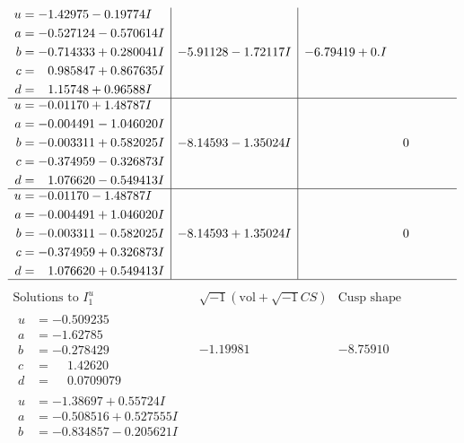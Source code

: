 \documentclass[1p]{elsarticle_modified}
\theoremstyle{definition}
\newcommand{\I}{\sqrt{-1}}
\begin{document}
$$\begin{array}{c|c|c}
\begin{aligned}
u &= -1.42975 - 0.19774 I \\
a &= -0.527124 - 0.570614 I \\
b &= -0.714333 + 0.280041 I \\
c &= \phantom{-}0.985847 + 0.867635 I \\
d &= \phantom{-}1.15748 + 0.96588 I\end{aligned}
 & -5.91128 - 1.72117 I & -6.79419 + 0. I\phantom{ +0.000000I} \\ \hline\begin{aligned}
u &= -0.01170 + 1.48787 I \\
a &= -0.004491 - 1.046020 I \\
b &= -0.003311 + 0.582025 I \\
c &= -0.374959 - 0.326873 I \\
d &= \phantom{-}1.076620 - 0.549413 I\end{aligned}
 & -8.14593 - 1.35024 I & \phantom{-0.000000 } 0 \\ \hline\begin{aligned}
u &= -0.01170 - 1.48787 I \\
a &= -0.004491 + 1.046020 I \\
b &= -0.003311 - 0.582025 I \\
c &= -0.374959 + 0.326873 I \\
d &= \phantom{-}1.076620 + 0.549413 I\end{aligned}
 & -8.14593 + 1.35024 I & \phantom{-0.000000 } 0\\
 \hline 
 \end{array}$$\newpage$$\begin{array}{c|c|c}  
\text{Solutions to }I^u_{1}& \I (\text{vol} + \sqrt{-1}CS) & \text{Cusp shape}\\
 \hline 
\begin{aligned}
u &= -0.509235\phantom{ +0.000000I} \\
a &= -1.62785\phantom{ +0.000000I} \\
b &= -0.278429\phantom{ +0.000000I} \\
c &= \phantom{-}1.42620\phantom{ +0.000000I} \\
d &= \phantom{-}0.0709079\phantom{ +0.000000I}\end{aligned}
 & -1.19981\phantom{ +0.000000I} & -8.75910\phantom{ +0.000000I} \\ \hline\begin{aligned}
u &= -1.38697 + 0.55724 I \\
a &= -0.508516 + 0.527555 I \\
b &= -0.834857 - 0.205621 I \\

\end{aligned}
\end{array}$$
\end{document}
